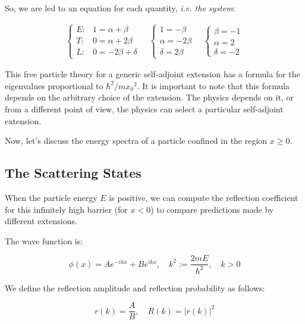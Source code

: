 \noindent
So, we are led to an equation for each quantity, \textit{i.e. the system}:

\begin{align}
    \begin{cases}
        E: & 1 = \alpha + \beta   \\
        T: & 0 = \alpha + 2\beta  \\
        L: & 0 = -2\beta + \delta
    \end{cases}
    \quad
    \begin{cases}
        1 = - \beta      \\
        \alpha = -2\beta \\
        \delta = 2\beta
    \end{cases}
    \quad
    \begin{cases}
        \beta = -1 \\
        \alpha = 2 \\
        \delta = -2
    \end{cases}
    \label{eq:free_par_dimensional}
\end{align}

\clearpage

\noindent
This free particle theory for a generic self-adjoint extension has a formula for the eigenvalues proportional to $\hbar^2/m {x_0}^2$. It is important to note that this formula depends on the arbitrary choice of the extension. The physics depends on it, or from a different point of view, the physics can select a particular self-adjoint extension.

\vspace{4mm}
\noindent
Now, let's discuss the energy spectra of a particle confined in the region \(x \geq 0\).

\subsection{The Scattering States}
When the particle energy \(E\) is positive, we can compute the reflection coefficient for this infinitely high barrier (for $x<0$) to compare predictions made by different extensions.

The wave function is:

\[
    \phi(x) = A e^{-ikx} + B e^{ikx}, \quad k^2 := \frac{2mE}{\hbar^2}, \quad k > 0
\]

\noindent
We define the reflection amplitude and reflection probability as follows:

\[
    r(k) = \frac{A}{B},  \quad R(k) = |r(k)|^2
\]

